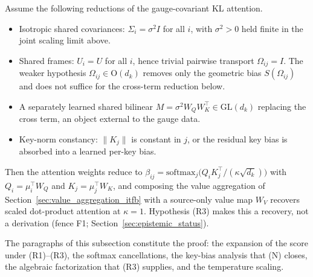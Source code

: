 \begin{theorem}
\label{thm:transformer_recovery}
Assume the following reductions of the gauge-covariant KL attention.
\begin{itemize}
\item[(R1)] Isotropic shared covariances: $\Sigma_i = \sigma^2 I$ for all $i$, with $\sigma^2 > 0$ held finite in the joint scaling limit above.
\item[(R2)] Shared frames: $U_i = U$ for all $i$, hence trivial pairwise transport $\Omega_{ij} = I$. The weaker hypothesis $\Omega_{ij} \in \mathrm{O}(d_k)$ removes only the geometric bias $S(\Omega_{ij})$ and does not suffice for the cross-term reduction below.
\item[(R3)] A separately learned shared bilinear $M = \sigma^2 W_QW_K^\top \in \mathrm{GL}(d_k)$ replacing the cross term, an object external to the gauge data.
\item[(N)] Key-norm constancy: $\|K_j\|$ is constant in $j$, or the residual key bias is absorbed into a learned per-key bias.
\end{itemize}
Then the attention weights reduce to $\beta_{ij} = \mathrm{softmax}_j\big(Q_iK_j^\top/(\kappa\sqrt{d_k})\big)$ with $Q_i = \mu_i^\top W_Q$ and $K_j = \mu_j^\top W_K$, and composing the value aggregation of Section~\ref{sec:value_aggregation_itfb} with a source-only value map $W_V$ recovers scaled dot-product attention at $\kappa = 1$. Hypothesis (R3) makes this a recovery, not a derivation (fence F1; Section~\ref{sec:epistemic_status}).
\end{theorem}

The paragraphs of this subsection constitute the proof: the expansion of the score under (R1)--(R3), the softmax cancellations, the key-bias analysis that (N) closes, the algebraic factorization that (R3) supplies, and the temperature scaling.


